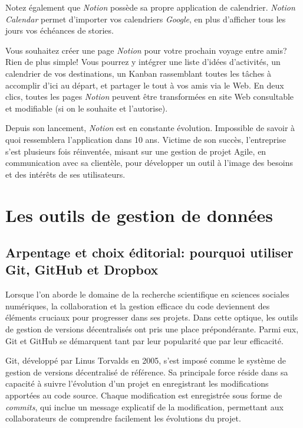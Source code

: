 \documentclass[
  letterpaper,
  DIV=11,
  numbers=noendperiod]{scrreprt}
\begin{document}
Notez également que \emph{Notion} possède sa propre application de
calendrier. \emph{Notion Calendar} permet d'importer vos calendriers
\emph{Google}, en plus d'afficher tous les jours vos échéances de
stories.

Vous souhaitez créer une page \emph{Notion} pour votre prochain voyage
entre amis? Rien de plus simple! Vous pourrez y intégrer une liste
d'idées d'activités, un calendrier de vos destinations, un Kanban
rassemblant toutes les tâches à accomplir d'ici au départ, et partager
le tout à vos amis via le Web. En deux clics, toutes les pages
\emph{Notion} peuvent être transformées en site Web consultable et
modifiable (si on le souhaite et l'autorise).

Depuis son lancement, \emph{Notion} est en constante évolution.
Impossible de savoir à quoi ressemblera l'application dans 10 ans.
Victime de son succès, l'entreprise s'est plusieurs fois réinventée,
misant sur une gestion de projet Agile, en communication avec sa
clientèle, pour développer un outil à l'image des besoins et des
intérêts de ses utilisateurs.

\hypertarget{les-outils-de-gestion-de-donnuxe9es}{%
\section{Les outils de gestion de
données}\label{les-outils-de-gestion-de-donnuxe9es}}

\hypertarget{arpentage-et-choix-uxe9ditorial-pourquoi-utiliser-git-github-et-dropbox}{%
\subsection{Arpentage et choix éditorial: pourquoi utiliser Git, GitHub
et
Dropbox}\label{arpentage-et-choix-uxe9ditorial-pourquoi-utiliser-git-github-et-dropbox}}

Lorsque l'on aborde le domaine de la recherche scientifique en sciences
sociales numériques, la collaboration et la gestion efficace du code
deviennent des éléments cruciaux pour progresser dans ses projets. Dans
cette optique, les outils de gestion de versions décentralisés ont pris
une place prépondérante. Parmi eux, Git et GitHub se démarquent tant par
leur popularité que par leur efficacité.

Git, développé par Linus Torvalds en 2005, s'est imposé comme le système
de gestion de versions décentralisé de référence. Sa principale force
réside dans sa capacité à suivre l'évolution d'un projet en enregistrant
les modifications apportées au code source. Chaque modification est
enregistrée sous forme de \emph{commits}, qui inclue un message
explicatif de la modification, permettant aux collaborateurs de
comprendre facilement les évolutions du projet.
\end{document}
